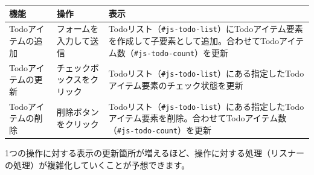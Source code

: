 \begin{longtable}[]{@{}lll@{}}
\toprule
\begin{minipage}[b]{0.10\columnwidth}\raggedright
機能\strut
\end{minipage} & \begin{minipage}[b]{0.15\columnwidth}\raggedright
操作\strut
\end{minipage} & \begin{minipage}[b]{0.66\columnwidth}\raggedright
表示\strut
\end{minipage}\tabularnewline
\midrule
\endhead
\begin{minipage}[t]{0.10\columnwidth}\raggedright
Todoアイテムの追加\strut
\end{minipage} & \begin{minipage}[t]{0.15\columnwidth}\raggedright
フォームを入力して送信\strut
\end{minipage} & \begin{minipage}[t]{0.66\columnwidth}\raggedright
Todoリスト（\texttt{\#js-todo-list}）にTodoアイテム要素を作成して子要素として追加。合わせてTodoアイテム数（\texttt{\#js-todo-count}）を更新\strut
\end{minipage}\tabularnewline
\begin{minipage}[t]{0.10\columnwidth}\raggedright
Todoアイテムの更新\strut
\end{minipage} & \begin{minipage}[t]{0.15\columnwidth}\raggedright
チェックボックスをクリック\strut
\end{minipage} & \begin{minipage}[t]{0.66\columnwidth}\raggedright
Todoリスト（\texttt{\#js-todo-list}）にある指定したTodoアイテム要素のチェック状態を更新\strut
\end{minipage}\tabularnewline
\begin{minipage}[t]{0.10\columnwidth}\raggedright
Todoアイテムの削除\strut
\end{minipage} & \begin{minipage}[t]{0.15\columnwidth}\raggedright
削除ボタンをクリック\strut
\end{minipage} & \begin{minipage}[t]{0.66\columnwidth}\raggedright
Todoリスト（\texttt{\#js-todo-list}）にある指定したTodoアイテム要素を削除。合わせてTodoアイテム数（\texttt{\#js-todo-count}）を更新\strut
\end{minipage}\tabularnewline
\bottomrule
\end{longtable}

1つの操作に対する表示の更新箇所が増えるほど、操作に対する処理（リスナーの処理）が複雑化していくことが予想できます。

